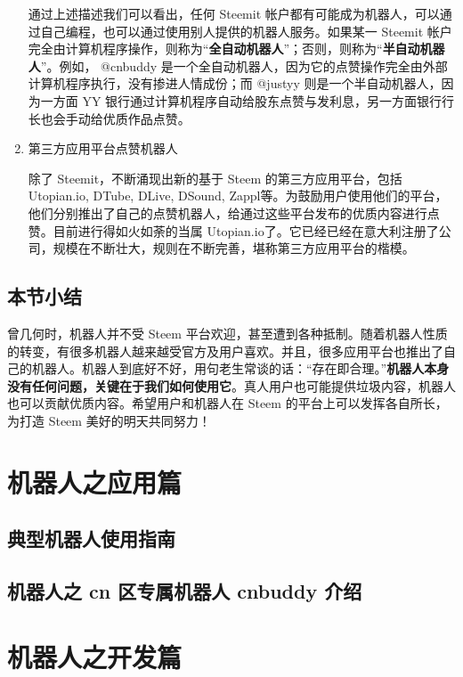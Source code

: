 \documentclass[]{ctexbook}
\begin{document}
\begin{enumerate}
  通过上述描述我们可以看出，任何 Steemit 帐户都有可能成为机器人，可以通过自己编程，也可以通过使用别人提供的机器人服务。如果某一 Steemit 帐户完全由计算机程序操作，则称为``\textbf{全自动机器人}''；否则，则称为``\textbf{半自动机器人}''。例如， @cnbuddy 是一个全自动机器人，因为它的点赞操作完全由外部计算机程序执行，没有掺进人情成份；而 @justyy 则是一个半自动机器人，因为一方面 YY 银行通过计算机程序自动给股东点赞与发利息，另一方面银行行长也会手动给优质作品点赞。
\item
  第三方应用平台点赞机器人

  除了 Steemit，不断涌现出新的基于 Steem 的第三方应用平台，包括 Utopian.io, DTube, DLive, DSound, Zappl等。为鼓励用户使用他们的平台，他们分别推出了自己的点赞机器人，给通过这些平台发布的优质内容进行点赞。目前进行得如火如荼的当属 Utopian.io了。它已经已经在意大利注册了公司，规模在不断壮大，规则在不断完善，堪称第三方应用平台的楷模。
\end{enumerate}

\hypertarget{bjxj}{%
\subsection{本节小结}\label{bjxj}}

曾几何时，机器人并不受 Steem 平台欢迎，甚至遭到各种抵制。随着机器人性质的转变，有很多机器人越来越受官方及用户喜欢。并且，很多应用平台也推出了自己的机器人。机器人到底好不好，用句老生常谈的话：``存在即合理。''\textbf{机器人本身没有任何问题，关键在于我们如何使用它}。真人用户也可能提供垃圾内容，机器人也可以贡献优质内容。希望用户和机器人在 Steem 的平台上可以发挥各自所长，为打造 Steem 美好的明天共同努力！

\hypertarget{jqrzyyp}{%
\section{机器人之应用篇}\label{jqrzyyp}}

\hypertarget{dxjqrsyzn}{%
\subsection{典型机器人使用指南}\label{dxjqrsyzn}}

\hypertarget{cnbot_cnbuddy}{%
\subsection{机器人之 cn 区专属机器人 cnbuddy 介绍}\label{cnbot_cnbuddy}}

\hypertarget{jqrzkfp}{%
\section{机器人之开发篇}\label{jqrzkfp}}
\end{document}
